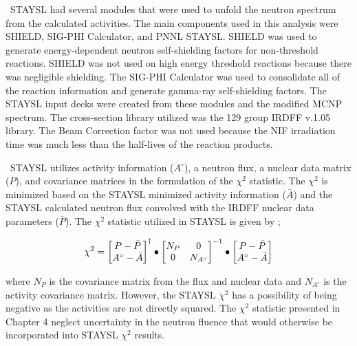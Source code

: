\ STAYSL had several modules that were used to unfold the neutron spectrum from the calculated activities. 
The main components used in this analysis were SHIELD, SIG-PHI Calculator, and PNNL STAYSL.  
SHIELD was used to generate energy-dependent neutron self-shielding factors for non-threshold reactions. 
SHIELD was not used on high energy threshold reactions because there was negligible shielding. The SIG-PHI Calculator was used to consolidate all of the reaction information and generate gamma-ray self-shielding factors. 
The STAYSL input decks were created from these modules and the modified MCNP spectrum. 
The cross-section library utilized was the 129 group IRDFF v.1.05 library. 
The Beam Correction factor was not used because the NIF irradiation time was much less than the half-lives of the reaction products. 

\ STAYSL utilizes activity information ($A^{\circ}$), a neutron flux, a nuclear data matrix ($P$), and covariance matrices in the formulation of the $\chi^{2}$ statistic. 
The $\chi^{2}$ is minimized based on the STAYSL minimized activity information ($\bar{A}$) and the STAYSL calculated neutron flux convolved with the IRDFF nuclear data parameters ($\bar{P}$). The $\chi^{2}$ statistic utilized in STAYSL is given by \cite{Perey1977};

\begin{equation} \label{eq:LeastSq}
\chi^{2} = \begin{bmatrix}
P-\bar{P} \\
A^{\circ}-\bar{A}    
\end{bmatrix}^{\dagger}
\space 
\bullet
\space 
\begin{bmatrix}
N_{P}  &  0      \\
0  &  N_{A^{\circ}}     
\end{bmatrix}^{-1}
\space
\bullet
\space
\begin{bmatrix}
P-\bar{P} \\
A^{\circ}-\bar{A}    
\end{bmatrix}
\end{equation} 

\noindent where $N_{P}$ is the covariance matrix from the flux and nuclear data and $N_{A^{\circ}}$ is the activity covariance matrix. 
However, the STAYSL $\chi^{2}$ has a possibility of being negative as the activities are not directly squared. 
The $\chi^{2}$ statistic presented in Chapter 4 neglect uncertainty in the neutron fluence that would otherwise be incorporated into STAYSL $\chi^{2}$ results.


